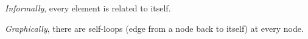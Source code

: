 
{\it Informally}, every element is related to itself.

{\it Graphically}, there are self-loops (edge from a node back to itself) at 
every node.
